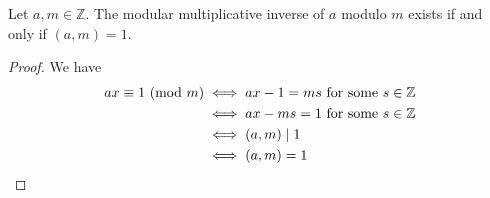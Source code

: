 \begin{theorem}
    Let $a,m\in\mathbb{Z}$. The modular multiplicative inverse of $a$ modulo $m$ exists if and only if $(a,m)=1$.
\end{theorem}
\begin{proof}
    We have
    \begin{align*}
        ax\equiv 1\ (\mathrm{mod}\ m)&\iff ax-1=ms\text{ for some $s\in\mathbb{Z}$} \\
                        &\iff ax-ms=1\text{ for some $s\in\mathbb{Z}$} \\
                        &\iff (a,m)\mid1 \\
                        &\iff (a,m)=1
    \end{align*}
\end{proof}

    

